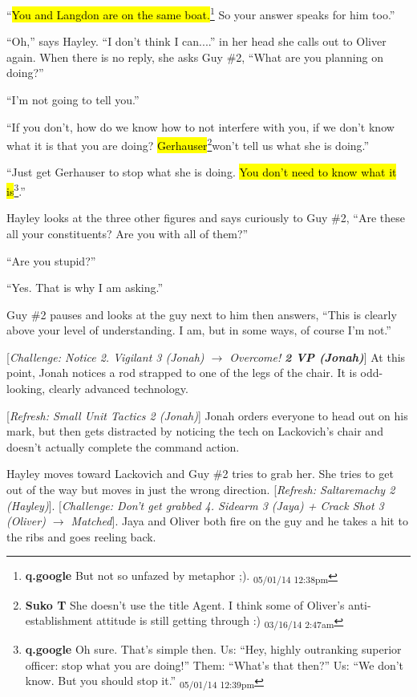 ``\hl{You and Langdon are on the same boat.}\footnote{\textbf{q.google }But not so unfazed by metaphor ;). \textsubscript{05/01/14 12:38pm}}  So your answer speaks for him too.''

``Oh,'' says Hayley. ``I don't think I can....''  in her head she calls out to Oliver again.  When there is no reply, she asks Guy \#2, ``What are you planning on doing?''

``I'm not going to tell you.''

``If you don't, how do we know how to not interfere with you, if we don't know what it is that you are doing?  \hl{Gerhauser}\footnote{\textbf{Suko T }She doesn't use the title Agent.  I think some of Oliver's anti-establishment attitude is still getting through :) \textsubscript{03/16/14 2:47am}}won't tell us what she is doing.''

``Just get Gerhauser to stop what she is doing.  \hl{You don't need to know what it is}\footnote{\textbf{q.google }Oh sure.  That's simple then.  Us: ``Hey, highly outranking superior officer: stop what you are doing!''
Them: ``What's that then?''
Us: ``We don't know.  But you should stop it.'' \textsubscript{05/01/14 12:39pm}}.''



Hayley looks at the three other figures and says curiously to Guy \#2, ``Are these all your constituents?  Are you with all of them?''

``Are you stupid?''

``Yes.  That is why I am asking.''

Guy \#2 pauses and looks at the guy next to him then answers, ``This is clearly above your level of understanding.  I am, but in some ways, of course I'm not.''



{[}\textit{Challenge: Notice 2.  Vigilant 3 (Jonah)  $\rightarrow$ Overcome! }\textit{\textbf{2 VP (Jonah)}}{]}  At this point, Jonah notices a rod strapped to one of the legs of the chair.  It is odd-looking, clearly advanced technology.



{[}\textit{Refresh: Small Unit Tactics 2 (Jonah)}{]}  Jonah orders everyone to head out on his mark, but then gets distracted by noticing the tech on Lackovich's chair and doesn't actually complete the command action.



Hayley moves toward Lackovich and Guy \#2 tries to grab her.  She tries to get out of the way but moves in just the wrong direction.  {[}\textit{Refresh: Saltaremachy 2 (Hayley)}{]}.  {[}\textit{Challenge: Don't get grabbed 4.  Sidearm 3 (Jaya) + Crack Shot 3 (Oliver) $\rightarrow$ Matched}{]}.  Jaya and Oliver both fire on the guy and he takes a hit to the ribs and goes reeling back.



